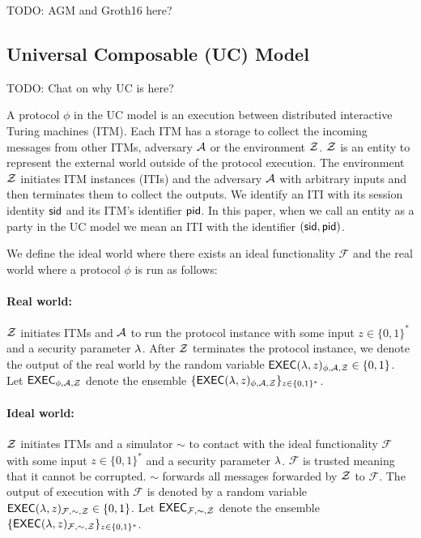 TODO: AGM and Groth16 here?


\subsection{Universal Composable (UC) Model}

TODO: Chat on why UC is here?

A protocol $ \phi $ in the UC model is an execution between distributed interactive Turing machines (ITM). Each ITM has a storage to collect the incoming messages from other ITMs, adversary $ \mathcal{A} $ or the environment $ \mathcal{Z} $. $ \mathcal{Z} $ is an entity to represent the external world outside of the protocol execution.  The environment $ \mathcal{Z} $ initiates ITM instances (ITIs) and the adversary $ \mathcal{A} $ with arbitrary inputs and then terminates them to collect the outputs.
We identify an ITI with its session identity $ \textsf{sid} $ and its ITM's identifier $ \textsf{pid} $. In this paper, when we call an entity as a party in the UC model we mean an ITI with the identifier $ (\textsf{sid}, \textsf{pid}) $.

We define the ideal world where there exists an ideal functionality $ \mathcal{F} $ and the real world where a protocol $ \phi $ is run as follows:

\paragraph{Real world:} $ \mathcal{Z} $ initiates ITMs and $ \mathcal{A} $ to run the protocol instance with some input $ z \in \{0,1\}^* $  and a security parameter $ \lambda $. After $ \mathcal{Z} $ terminates the protocol instance, we denote the output of the real world by the random variable $ \mathsf{EXEC}(\lambda, z)_{\phi, \mathcal{A}, \mathcal{Z}} \in \{0,1\} $. Let $ \mathsf{EXEC}_{\phi, \mathcal{A}, \mathcal{Z}} $ denote the ensemble $ \{\mathsf{EXEC}(\lambda, z)_{\phi, \mathcal{A}, \mathcal{Z}} \}_{z \in \{0,1\}^*} $.

\paragraph{Ideal world:} $ \mathcal{Z} $ initiates ITMs and a simulator $ \sim $ to contact with the ideal functionality $ \mathcal{F} $ with some input $ z \in \{0,1\}^* $  and a security parameter $ \lambda $. $ \mathcal{F} $ is trusted meaning that it cannot be corrupted.
$ \sim $ forwards all messages forwarded by $ \mathcal{Z} $ to $ \mathcal{F} $. The output of execution with $ \mathcal{F} $ is denoted by a random variable $ \mathsf{EXEC}(\lambda, z)_{\mathcal{F},\sim, \mathcal{Z}} \in \{0,1\}$.  Let $ \mathsf{EXEC}_{\mathcal{F},\sim, \mathcal{Z}} $ denote the ensemble $ \{\mathsf{EXEC}(\lambda, z)_{\mathcal{F}, \sim, \mathcal{Z}} \}_{z \in \{0,1\}^*} $.

